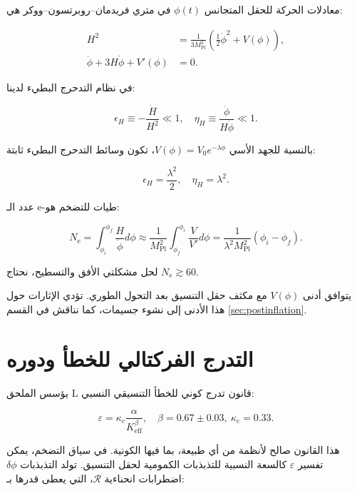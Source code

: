 \documentclass[11pt,a4paper]{article}
\theoremstyle{remark}
\newcommand{\Keff}{K_{\mathrm{eff}}}
\newcommand{\kappac}{\kappa_c}
\newcommand{\eps}{\varepsilon}
\newcommand{\Mpl}{M_{\mathrm{Pl}}}
\newcommand{\ninf}{N_{\mathrm{e}}}
\begin{document}
	معادلات الحركة للحقل المتجانس $\phi(t)$ في متري فريدمان–روبرتسون–ووكر هي:
	
	\begin{align}
		H^2 &= \frac{1}{3\Mpl^2} \left( \frac{1}{2}\dot{\phi}^2 + V(\phi) \right), \label{eq:friedman1} \\
		\ddot{\phi} + 3H\dot{\phi} + V'(\phi) &= 0. \label{eq:field}
	\end{align}
	
	في نظام التدحرج البطيء لدينا:
	
	\begin{equation}
		\epsilon_H \equiv -\frac{\dot{H}}{H^2} \ll 1, \quad \eta_H \equiv \frac{\ddot{\phi}}{H\dot{\phi}} \ll 1.
	\end{equation}
	
	بالنسبة للجهد الأسي $V(\phi) = V_0 e^{-\lambda \phi}$، تكون وسائط التدحرج البطيء ثابتة:
	
	\begin{equation}
		\epsilon_H = \frac{\lambda^2}{2}, \quad \eta_H = \lambda^2.
		\label{eq:slowroll}
	\end{equation}
	
	عدد الـ e-طيات للتضخم هو:
	
	\begin{equation}
		\ninf = \int_{\phi_i}^{\phi_f} \frac{H}{\dot{\phi}} d\phi \approx \frac{1}{\Mpl^2} \int_{\phi_f}^{\phi_i} \frac{V}{V'} d\phi = \frac{1}{\lambda^2 \Mpl^2} (\phi_i - \phi_f).
	\end{equation}
	
	لحل مشكلتي الأفق والتسطيح، نحتاج $\ninf \gtrsim 60$.
	
	يتوافق أدنى $V(\phi)$ مع مكثف حقل التنسيق بعد التحول الطوري. تؤدي الإثارات حول هذا الأدنى إلى نشوء جسيمات، كما نناقش في القسم \ref{sec:postinflation}.
	
	\section{التدرج الفركتالي للخطأ ودوره}
	\label{sec:fractal}
	
	يؤسس الملحق L قانون تدرج كوني للخطأ التنسيقي النسبي:
	
	\begin{equation}
		\eps = \kappac \frac{\alpha}{\Keff^{\beta}}, \quad \beta = 0.67 \pm 0.03,\ \kappac = 0.33.
		\label{eq:error-scaling}
	\end{equation}
	
	هذا القانون صالح لأنظمة من أي طبيعة، بما فيها الكونية. في سياق التضخم، يمكن تفسير $\eps$ كالسعة النسبية للتذبذبات الكمومية لحقل التنسيق. تولد التذبذبات $\delta \phi$ اضطرابات انحناءية $\mathcal{R}$، التي يعطى قدرها بـ:
	
\end{document}
